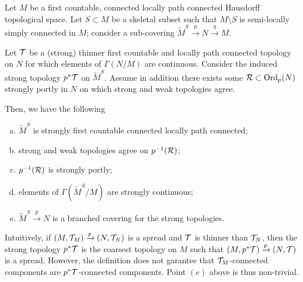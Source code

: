 \begin{lem} \label{lem:spread_top} Let $M$ be a first countable, connected locally path connected Hausdorff topological space. Let $S\subset M$ be a skeletal subset such that $M\setminus S$ is semi-locally simply connected in $M$;
consider a sub-covering $\widetilde M^S\xrightarrow{p}N\xrightarrow{q}M$.

Let $\mathcal{T}$ be a (strong) thinner first countable and locally path connected topology on $N$ for which elements of $\Gamma(N/M)$ are continuous. Consider the induced strong topology $p^*\mathcal{T}$ on $\widetilde M^S$.
Assume in addition there exists some $\mathcal R \subset \mathrm{Ord}_p(N)$ strongly portly  in $N$ on which strong and weak topologies agree.

 Then, we have the following
 \begin{enumerate}[(a)]
 \item $\widetilde M^S$ is strongly first countable connected locally path connected;
 \item strong and weak topologies agree on $p^{-1}(\mathcal R)$; 
 \item $p^{-1}(\mathcal R)$ is strongly portly;
  \item elements of $\Gamma(\widetilde M^S/M)$ are  strongly continuous;
  \item $\widetilde M^S\xrightarrow{p}N$ is a branched covering for the strong
  topologies.
  \end{enumerate}
\end{lem}
\begin{rem}\label{rem:intuitively_spread_thinner_than}
 Intuitively, if $(M,\mathcal{T}_M)\xrightarrow{p}(N,\mathcal{T}_N)$ is a spread and $\mathcal{T}$ is thinner than $\mathcal{T}_N$, then the strong topology $p^*\mathcal{T}$ is the coarsest topology on $M$ such that $(M,p^*\mathcal{T})\xrightarrow{p}(N,\mathcal{T})$ is a spread. However, the definition does not garantee that $\mathcal{T}_M$-connected components are $p^*\mathcal{T}$-connected components. Point $(e)$ above is thus non-trivial.
\end{rem}

